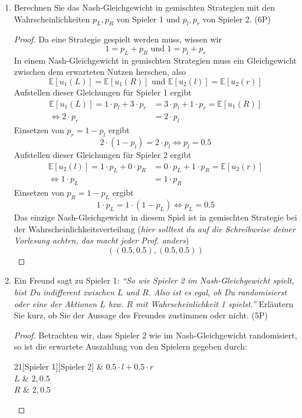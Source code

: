 \documentclass[12pt]{article}
\begin{document}
\begin{enumerate}[label=\alph*\upshape)]
\begin{proof}
			Das heißt hier gibt es kein Nash-Gleichgewicht in reinen Strategien.
		\end{proof}
	\item Berechnen Sie das Nash-Gleichgewicht in gemischten Strategien mit den Wahrscheinlichkeiten $p_L, p_R$ von Spieler 1 und $p_l, p_r$ von Spieler 2. (6P)
		\begin{proof}
			Da eine Strategie gespielt werden muss, wissen wir
			$$ 1 = p_L + p_R \text{ und } 1 = p_l + p_r $$
			In einem Nash-Gleichgewicht in gemischten Strategien muss ein Gleichgewicht zwischen dem erwarteten Nutzen herschen, also
			$$ \mathbb{E}[u_1(L)] = \mathbb{E}[u_1(R)] \text{ und } \mathbb{E}[u_2(l)] = \mathbb{E}[u_2(r)] $$ 
			Aufstellen dieser Gleichungen für Spieler 1 ergibt
			\begin{align*}
				\mathbb{E}[u_1(L)]  = 1 \cdot p_l + 3 \cdot p_r & = 3 \cdot p_l + 1 \cdot p_r = \mathbb{E}[u_1(R)] \\
				\iff 2 \cdot p_r & = 2 \cdot p_l
			\end{align*}
			Einsetzen von $p_r = 1 - p_l$ ergibt
			$$ 2 \cdot (1 - p_l) = 2 \cdot p_l \iff p_l = 0.5 $$
			Aufstellen dieser Gleichungen für Spieler 2 ergibt
			\begin{align*}
				\mathbb{E}[u_2(l)]  = 1 \cdot p_L + 0 \cdot p_R & = 0 \cdot p_L + 1 \cdot p_R = \mathbb{E}[u_2(r)] \\
				\iff 1 \cdot p_L & = 1 \cdot p_R
			\end{align*}
			Einsetzen von $p_R = 1 - p_L$ ergibt
			$$ 1 \cdot p_L = 1 \cdot (1 - p_L) \iff p_L = 0.5 $$
			Das einzige Nash-Gleichgewicht in diesem Spiel ist in gemischten Strategie bei der Wahrscheinlichkeitsverteilung (\textit{hier solltest du auf die Schreibweise deiner Vorlesung achten, das macht jeder Prof. anders})
			$$ \left( (0.5, 0.5), (0.5, 0.5) \right) $$
		\end{proof}
	\item Ein Freund sagt zu Spieler 1: \textit{\enquote{So wie Spieler 2 im Nash-Gleichgewicht spielt, bist Du indifferent zwischen $L$ und $R$. Also ist es egal, ob Du randomisierst oder eine der Aktionen $L$ bzw. $R$ mit Wahrscheinlichkeit 1 spielst.}} Erläutern Sie kurz, ob Sie der Aussage des Freundes zustimmen oder nicht. (5P)
		\begin{proof}
			Betrachten wir, dass Spieler 2 wie im Nash-Gleichgewicht randomisiert, so ist die erwartete Auszahlung von den Spielern gegeben durch: 
						
			\begin{center}
				\begin{game}{2}{1}[Spieler 1][Spieler 2]
					    & $0.5 \cdot l + 0.5 \cdot r$   \\
	 				$L$ &  $2, 0.5$ \\
	 				$R$ &  $2, 0.5$  \\
				\end{game}
			\end{center}
		

\end{proof}
\end{enumerate}
\end{document}
